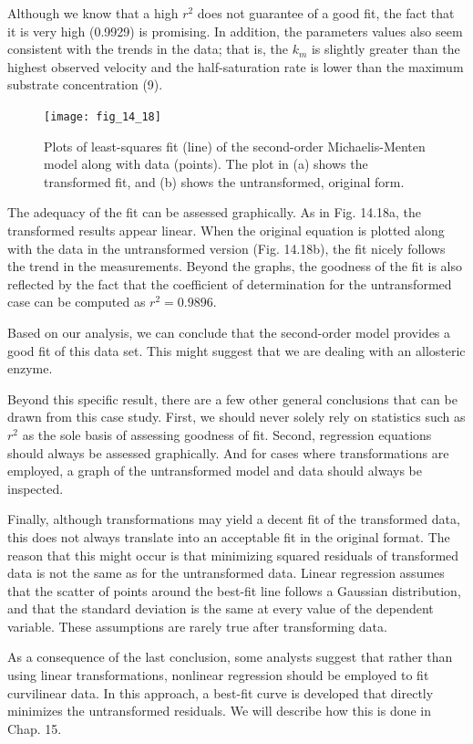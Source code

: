 \documentclass[../main.tex]{subfiles}
\begin{document}
Although we know that a high $r^2$ does not guarantee of a good fit, the fact that it is very high (0.9929) is promising. In addition, the parameters values also seem consistent with the trends in the data; that is, the $k_m$ is slightly greater than the highest observed velocity and the half-saturation rate is lower than the maximum substrate concentration (9).

\begin{figure}[H] 
	\centering
	\texttt{[image: fig\_14\_18]}
	\caption{\textsf{Plots of least-squares fit (line) of the second-order Michaelis-Menten model along with data (points). The plot in (a) shows the transformed fit, and (b) shows the untransformed, original form.}}
	\label{fig:fig_14_18}
\end{figure}

The adequacy of the fit can be assessed graphically. As in Fig. 14.18a, the transformed results appear linear. When the original equation is plotted along with the data in the untransformed version (Fig. 14.18b), the fit nicely follows the trend in the measurements. Beyond the graphs, the goodness of the fit is also reflected by the fact that the coefficient of determination for the untransformed case can be computed as $r^2 = 0.9896$.

Based on our analysis, we can conclude that the second-order model provides a good fit of this data set. This might suggest that we are dealing with an allosteric enzyme. 

Beyond this specific result, there are a few other general conclusions that can be drawn from this case study. First, we should never solely rely on statistics such as $r^2$ as the sole basis of assessing goodness of fit. Second, regression equations should always be assessed graphically. And for cases where transformations are employed, a graph of the untransformed model and data should always be inspected. 

Finally, although transformations may yield a decent fit of the transformed data, this does not always translate into an acceptable fit in the original format. The reason that this might occur is that minimizing squared residuals of transformed data is not the same as for the untransformed data. Linear regression assumes that the scatter of points around the best-fit line follows a Gaussian distribution,  and that the standard deviation is the same at every value of the dependent variable. These assumptions are rarely true after transforming data. 

As a consequence of the last conclusion, some analysts suggest that rather than using linear transformations, nonlinear regression should be employed to fit curvilinear data. In this approach, a best-fit curve is developed that directly minimizes the untransformed residuals. We will describe how this is done in Chap. 15.
\end{document}
